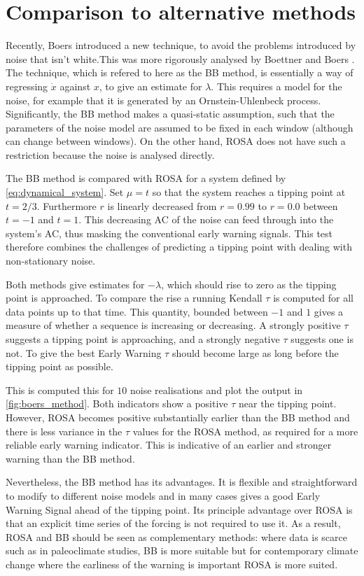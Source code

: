 \section{Comparison to alternative methods}
Recently, Boers \parencite{Boers2021a} introduced a new technique,
to avoid the problems introduced by noise that isn't white.This was
more rigorously analysed by Boettner and Boers \parencite{Boettner2022}. The
technique, which is refered to here as the BB method, is essentially a way of
regressing $\dot{x}$ against $x$, to give an estimate for $\lambda$. 
This requires a model for the noise, for example that it is
generated by an Ornstein-Uhlenbeck process. Significantly, the BB method makes a quasi-static assumption, such that the parameters of the noise
model are assumed to be fixed in each window (although can change between windows). On the other hand,
ROSA does not have such a restriction because the noise is analysed directly.

The BB method is compared with ROSA for a system defined by
\cref{eq:dynamical_system}. Set $\mu  = t$ so that the system
reaches a tipping point at $t=2/3$. Furthermore $r$ is linearly decreased
from $r=0.99$ to $r=0.0$ between $t=-1$ and $t=1$.
This decreasing AC of the
noise can feed through into the system's AC, thus masking
the conventional early warning signals. This test therefore
combines the challenges of predicting a tipping point with dealing
with non-stationary noise.

Both methods give estimates for $-\lambda$, which should rise
to zero as the tipping point is approached. To compare the 
rise a running Kendall $\tau$ \parencite{Wilks2019} is computed for all data points up to
that time. This quantity, bounded 
between $-1$ and $1$ gives a measure of whether a sequence is 
increasing or decreasing. A strongly positive $\tau$ suggests a tipping point is approaching, and a strongly
negative $\tau$ suggests one is not. To give the best Early Warning $\tau$ should become
large as long before the tipping point as possible.


This is computed this for $10$ noise realisations and plot the output 
in \cref{fig:boers_method}. Both indicators show a positive 
$\tau$ near the tipping point. However, ROSA becomes positive substantially earlier than the BB method and there is
less variance in the $\tau$ values for the ROSA method, as required for a more reliable early warning indicator.
This is indicative of an earlier and stronger warning than the BB method. 

Nevertheless, the BB method has its advantages.
It is flexible and straightforward to modify to different noise
models and in many cases gives a good Early Warning Signal 
ahead of the tipping point. Its principle advantage
over ROSA is that an explicit time series of the forcing is not required to use it. As a result, ROSA and BB should be seen as complementary methods: 
where data is scarce such as in paleoclimate studies, BB is more suitable but 
for contemporary climate change where the earliness of the warning is 
important ROSA is more suited.

